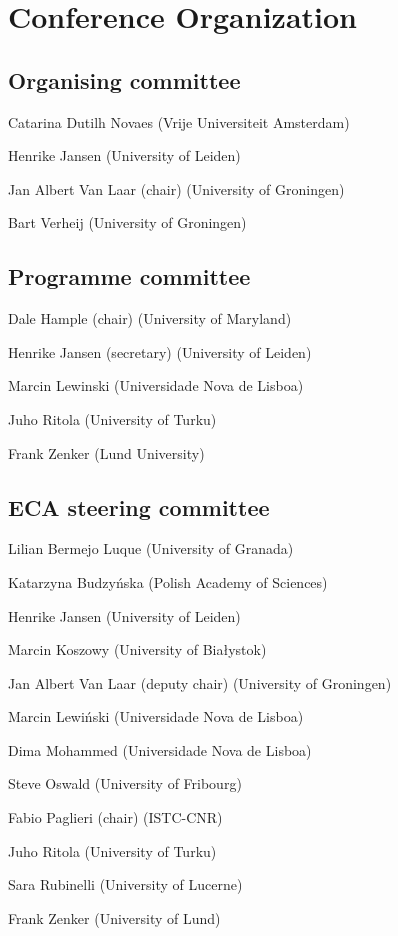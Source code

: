 \newpage

\section*{Conference Organization}
	\subsection*{Organising committee}
	\begin{compactitem}[]
		\item[] Catarina Dutilh Novaes (Vrije Universiteit Amsterdam)
		\item[] Henrike Jansen (University of Leiden)
		\item[] Jan Albert Van Laar (chair) (University of Groningen)
		\item[] Bart Verheij (University of Groningen)
	\end{compactitem}

	\subsection*{Programme committee}
	\begin{compactitem}[]
		\item[] Dale Hample (chair) (University of Maryland)
		\item[] Henrike Jansen (secretary) (University of Leiden)
		\item[] Marcin Lewinski (Universidade Nova de Lisboa)
		\item[] Juho Ritola (University of Turku)
		\item[] Frank Zenker (Lund University)
 	\end{compactitem}

 	\subsection*{ECA steering committee}
 	\begin{compactitem}[]
		\item[] Lilian Bermejo Luque (University of Granada)
		\item[] Katarzyna Budzyńska (Polish Academy of Sciences)
		\item[] Henrike Jansen (University of Leiden)
		\item[] Marcin Koszowy (University of Białystok)
		\item[] Jan Albert Van Laar (deputy chair) (University of Groningen)
		\item[] Marcin Lewiński (Universidade Nova de Lisboa)
		\item[] Dima Mohammed (Universidade Nova de Lisboa)
		\item[] Steve Oswald (University of Fribourg)
		\item[] Fabio Paglieri (chair) (ISTC-CNR)
		\item[] Juho Ritola (University of Turku)
		\item[] Sara Rubinelli (University of Lucerne)
		\item[] Frank Zenker (University of Lund)
	\end{compactitem}


